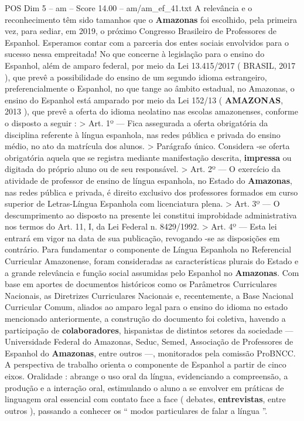 \begin{textsample}{POS Dim 5 – am – Score 14.00 – am/am\_ef\_41.txt}
A relevância e o reconhecimento têm sido tamanhos que o \textbf{Amazonas} foi escolhido, pela primeira vez, para sediar, em 2019, o próximo Congresso Brasileiro de Professores de Espanhol.
Esperamos contar com a parceria dos entes sociais envolvidos para o sucesso nessa empreitada!
No que concerne à legislação para o ensino do Espanhol, além de amparo federal, por meio da Lei 13.415/2017 ( BRASIL, 2017 ), que prevê a possibilidade do ensino de um segundo idioma estrangeiro, preferencialmente o Espanhol, no que tange ao âmbito estadual, no Amazonas, o ensino do Espanhol está amparado por meio da Lei 152/13 ( \textbf{AMAZONAS}, 2013 ), que prevê a oferta do idioma neolatino nas escolas amazonenses, conforme o disposto a seguir : > Art. 1º — Fica assegurada a oferta obrigatória da disciplina referente à língua espanhola, nas redes pública e privada do ensino médio, no ato da matrícula dos alunos. > Parágrafo único.
Considera -se oferta obrigatória aquela que se registra mediante manifestação descrita, \textbf{impressa} ou digitada do próprio aluno ou de seu responsável. > Art. 2º — O exercício da atividade de professor de ensino de língua espanhola, no Estado do \textbf{Amazonas}, nas redes pública e privada, é direito exclusivo dos professores formados em curso superior de Letras-Língua Espanhola com licenciatura plena. > Art. 3º — O descumprimento ao disposto na presente lei constitui improbidade administrativa nos termos do Art. 11, I, da Lei Federal n. 8429/1992. > Art. 4º — Esta lei entrará em vigor na data de sua publicação, revogando -se as disposições em contrário.
Para fundamentar o componente de Língua Espanhola no Referencial Curricular Amazonense, foram consideradas as características plurais do Estado e a grande relevância e função social assumidas pelo Espanhol no \textbf{Amazonas}.
Com base em aportes de documentos históricos como os Parâmetros Curriculares Nacionais, as Diretrizes Curriculares Nacionais e, recentemente, a Base Nacional Curricular Comum, aliados ao amparo legal para o ensino do idioma no estado mencionado anteriormente, a construção do documento foi coletiva, havendo a participação de \textbf{colaboradores}, hispanistas de distintos setores da sociedade — Universidade Federal do Amazonas, Seduc, Semed, Associação de Professores de Espanhol do \textbf{Amazonas}, entre outros —, monitorados pela comissão ProBNCC.
A perspectiva de trabalho orienta o componente de Espanhol a partir de cinco eixos.
Oralidade : abrange o uso oral da língua, evidenciando a compreensão, a produção e a interação oral, estimulando o aluno a se envolver em práticas de linguagem oral essencial com contato face a face ( debates, \textbf{entrevistas}, entre outros ), passando a conhecer os “ modos particulares de falar a língua ”.

\end{textsample}
